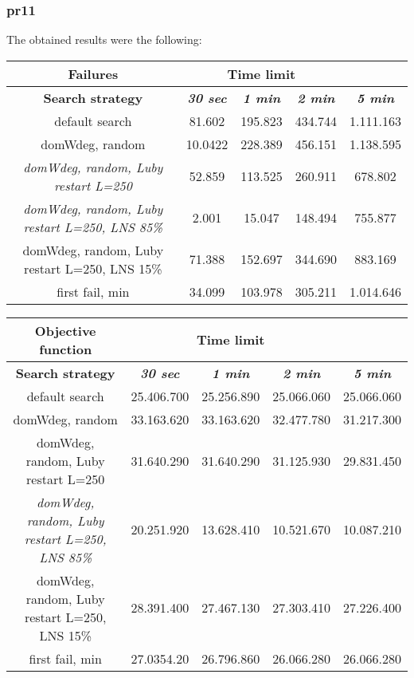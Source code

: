 \subsubsection{pr11}
The obtained results were the following:
{
\renewcommand{\arraystretch}{2}
\begin{longtable}[h]{| c | c | c | c | c |}
    \hline
    \textbf{Failures} & \multicolumn{3}{c}{Time limit} & \\
    \hline
    \textbf{Search strategy} & \textbf{\textit{30 sec}} & \textbf{\textit{1 min}} & \textbf{\textit{2 min}} & \textbf{\textit{5 min}} \\
    \hline
    \endhead
    default search                                         &  81.602 & 195.823 & 434.744 & 1.111.163 \\
    \hline
    domWdeg, random                                        & 10.0422 & 228.389 & 456.151 & 1.138.595 \\
    \hline
    \textit{domWdeg, random, Luby restart L=250}           &  52.859 & 113.525 & 260.911 &  678.802 \\
    \hline
    \textit{domWdeg, random, Luby restart L=250, LNS 85\%} &   2.001 &  15.047 & 148.494 &  755.877 \\
    \hline
    domWdeg, random, Luby restart L=250, LNS 15\%          &  71.388 & 152.697 & 344.690 &  883.169 \\
    \hline
    first fail, min                                        &  34.099 & 103.978 & 305.211 & 1.014.646 \\
    \hline
\end{longtable}
}

{
\renewcommand{\arraystretch}{2}
\begin{longtable}[h]{| c | c | c | c | c |}
    \hline
    \textbf{Objective function} & \multicolumn{3}{c}{Time limit} & \\
    \hline
    \textbf{Search strategy} & \textbf{\textit{30 sec}} & \textbf{\textit{1 min}} & \textbf{\textit{2 min}} & \textbf{\textit{5 min}} \\
    \hline
    \endhead
    default search                                         & 25.406.700 & 25.256.890 & 25.066.060 & 25.066.060 \\
    \hline
    domWdeg, random                                        & 33.163.620 & 33.163.620 & 32.477.780 & 31.217.300 \\
    \hline
    domWdeg, random, Luby restart L=250                    & 31.640.290 & 31.640.290 & 31.125.930 & 29.831.450 \\
    \hline
    \textit{domWdeg, random, Luby restart L=250, LNS 85\%} & 20.251.920 & 13.628.410 & 10.521.670 & 10.087.210 \\
    \hline
    domWdeg, random, Luby restart L=250, LNS 15\%          & 28.391.400 & 27.467.130 & 27.303.410 & 27.226.400 \\
    \hline
    first fail, min                                        & 27.0354.20 & 26.796.860 & 26.066.280 & 26.066.280 \\
    \hline
\end{longtable}
}
